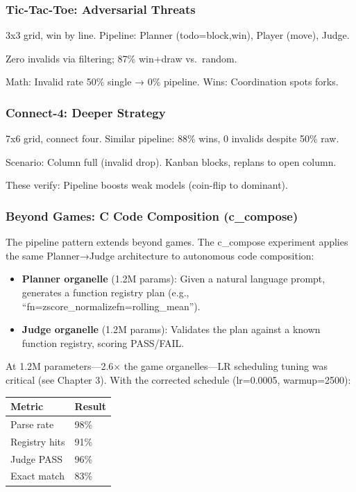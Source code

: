 \documentclass[
]{article}
\providecommand{\tightlist}{%
  \setlength{\itemsep}{0pt}\setlength{\parskip}{0pt}}
\begin{document}
\subsubsection{Tic-Tac-Toe: Adversarial
Threats}\label{tic-tac-toe-adversarial-threats}

3x3 grid, win by line. Pipeline: Planner (todo=block,win), Player
(move), Judge.

Zero invalids via filtering; 87\% win+draw vs.~random.

Math: Invalid rate 50\% single → 0\% pipeline. Wins: Coordination spots
forks.

\subsubsection{Connect-4: Deeper
Strategy}\label{connect-4-deeper-strategy}

7x6 grid, connect four. Similar pipeline: 88\% wins, 0 invalids despite
50\% raw.

Scenario: Column full (invalid drop). Kanban blocks, replans to open
column.

These verify: Pipeline boosts weak models (coin-flip to dominant).

\subsubsection{Beyond Games: C Code Composition
(c\_compose)}\label{beyond-games-c-code-composition-c99_compose}

The pipeline pattern extends beyond games. The c\_compose experiment
applies the same Planner→Judge architecture to autonomous code
composition:

\begin{itemize}
\tightlist
\item
  \textbf{Planner organelle} (1.2M params): Given a natural language
  prompt, generates a function registry plan (e.g.,
  ``fn=zscore\_normalize\textbar fn=rolling\_mean'').
\item
  \textbf{Judge organelle} (1.2M params): Validates the plan against a
  known function registry, scoring PASS/FAIL.
\end{itemize}

At 1.2M parameters---2.6× the game organelles---LR scheduling tuning was
critical (see Chapter 3). With the corrected schedule (lr=0.0005,
warmup=2500):

\begin{longtable}[]{@{}ll@{}}
\toprule\noalign{}
Metric & Result \\
\midrule\noalign{}
\endhead
\bottomrule\noalign{}
\endlastfoot
Parse rate & 98\% \\
Registry hits & 91\% \\
Judge PASS & 96\% \\
Exact match & 83\% \\
\end{longtable}
\end{document}
